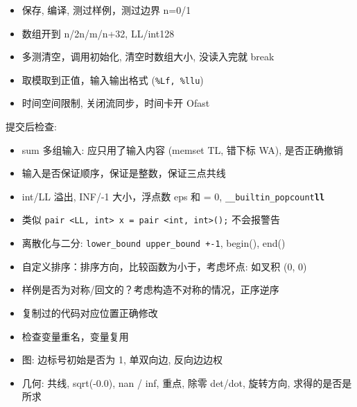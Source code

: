 \begin{small}
\begin{itemize}[leftmargin=1mm]
    \setlength{\itemsep}{0pt}
    \setlength{\parskip}{0.5pt}
\item 保存, 编译, 测过样例，测过边界 n=0/1
\item 数组开到 n/2n/m/n+32, LL/int128
\item 多测清空，调用初始化, 清空时数组大小, 没读入完就 break 
\item 取模取到正值，输入输出格式 (\texttt{\%Lf, \%llu})
\item 时间空间限制, 关闭流同步，时间卡开 Ofast
\end{itemize}
提交后检查:
\begin{itemize}[leftmargin=1mm]
\setlength{\itemsep}{0pt}
\setlength{\parskip}{0.5pt}
\item sum 多组输入: 应只用了输入内容 (memset TL, 错下标 WA), 是否正确撤销
\item 输入是否保证顺序，保证是整数，保证三点共线
\item int/LL 溢出, INF/-1 大小，浮点数 eps 和 = 0, \texttt{\_\_builtin\_popcount\textbf{ll}}
\item 类似 \texttt{pair <LL, int> x = pair <int, int>();} 不会报警告 
\item 离散化与二分: \texttt{lower\_bound upper\_bound +-1}, begin(), end()
\item 自定义排序：排序方向，比较函数为小于，考虑坏点: 如叉积 (0, 0)
\item 样例是否为对称/回文的？考虑构造不对称的情况，正序逆序
\item 复制过的代码对应位置正确修改
\item 检查变量重名，变量复用
\item 图: 边标号初始是否为 1, 单双向边, 反向边边权
\item 几何: 共线, sqrt(-0.0), nan / inf, 重点, 除零 det/dot, 旋转方向, 求得的是否是所求
\end{itemize}
\end{small}
